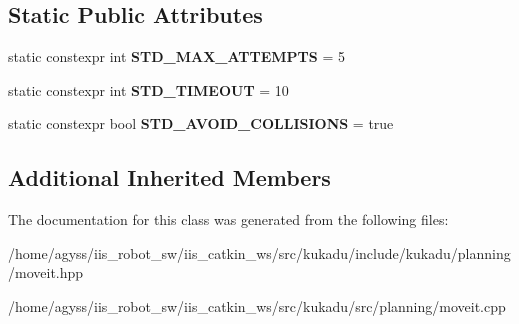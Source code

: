 \subsection*{Static Public Attributes}
\begin{DoxyCompactItemize}
\item 
static constexpr int {\bfseries S\+T\+D\+\_\+\+M\+A\+X\+\_\+\+A\+T\+T\+E\+M\+P\+TS} = 5\hypertarget{classkukadu_1_1MoveIt_add665929ffeb6ce186119fa47ddbe3cf}{}\label{classkukadu_1_1MoveIt_add665929ffeb6ce186119fa47ddbe3cf}

\item 
static constexpr int {\bfseries S\+T\+D\+\_\+\+T\+I\+M\+E\+O\+UT} = 10\hypertarget{classkukadu_1_1MoveIt_ac4b2f2756039fa58060eebd87c788c18}{}\label{classkukadu_1_1MoveIt_ac4b2f2756039fa58060eebd87c788c18}

\item 
static constexpr bool {\bfseries S\+T\+D\+\_\+\+A\+V\+O\+I\+D\+\_\+\+C\+O\+L\+L\+I\+S\+I\+O\+NS} = true\hypertarget{classkukadu_1_1MoveIt_afc4bca8312888ae169bed7dbd16a5cca}{}\label{classkukadu_1_1MoveIt_afc4bca8312888ae169bed7dbd16a5cca}

\end{DoxyCompactItemize}
\subsection*{Additional Inherited Members}


The documentation for this class was generated from the following files\+:\begin{DoxyCompactItemize}
\item 
/home/agyss/iis\+\_\+robot\+\_\+sw/iis\+\_\+catkin\+\_\+ws/src/kukadu/include/kukadu/planning/moveit.\+hpp\item 
/home/agyss/iis\+\_\+robot\+\_\+sw/iis\+\_\+catkin\+\_\+ws/src/kukadu/src/planning/moveit.\+cpp\end{DoxyCompactItemize}
